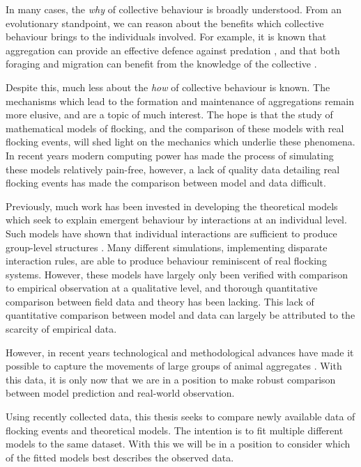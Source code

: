 In many cases, the \emph{why} of collective behaviour is broadly understood. From an
evolutionary standpoint, we can reason about the benefits which collective behaviour
brings to the individuals involved. For example, it is known that aggregation can provide
an effective defence against predation \parencite{landeau86}, and that both foraging and
migration can benefit from the knowledge of the collective \parencite{simmons04}.

Despite this, much less about the \emph{how} of collective behaviour is known. The
mechanisms which lead to the formation and maintenance of aggregations remain more
elusive, and are a topic of much interest. The hope is that the study of mathematical
models of flocking, and the comparison of these models with real flocking events, will
shed light on the mechanics which underlie these phenomena. In recent years modern
computing power has made the process of simulating these models relatively pain-free,
however, a lack of quality data detailing real flocking events has made the comparison
between model and data difficult.

Previously, much work has been invested in developing the theoretical models which seek to
explain emergent behaviour by interactions at an individual level. Such models have shown
that individual interactions are sufficient to produce group-level structures
\parencite{aoki82}. Many different simulations, implementing disparate interaction rules,
are able to produce behaviour reminiscent of real flocking systems. However, these models
have largely only been verified with comparison to empirical observation at a qualitative
level, and thorough quantitative comparison between field data and theory has been
lacking. This lack of quantitative comparison between model and data can largely be
attributed to the scarcity of empirical data.

However, in recent years technological and methodological advances have made it possible
to capture the movements of large groups of animal aggregates \parencite{ballerini08}.
With this data, it is only now that we are in a position to make robust comparison between
model prediction and real-world observation.

Using recently collected data, this thesis seeks to compare newly available data of
flocking events and theoretical models. The intention is to fit multiple different models
to the same dataset. With this we will be in a position to consider which of the fitted
models best describes the observed data.


